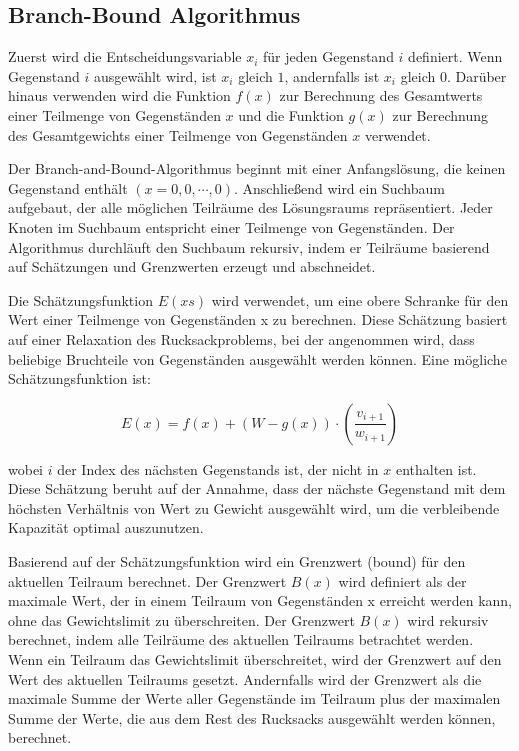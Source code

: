 \subsection{Branch-Bound Algorithmus}
Zuerst wird die Entscheidungsvariable $x_i$ für jeden 
Gegenstand $i$ definiert. Wenn Gegenstand $i$ ausgewählt wird, ist $x_i$ 
gleich $1$, andernfalls ist $x_i$ gleich $0$. Darüber hinaus 
verwenden wird die Funktion $f(x)$ zur Berechnung des 
Gesamtwerts einer Teilmenge von Gegenständen $x$ und die 
Funktion $g(x)$ zur Berechnung des Gesamtgewichts einer 
Teilmenge von Gegenständen $x$ verwendet.

Der Branch-and-Bound-Algorithmus beginnt mit einer 
Anfangslösung, die keinen Gegenstand enthält 
$(x = {0, 0, \cdots, 0})$. Anschließend wird ein Suchbaum 
aufgebaut, der alle möglichen Teilräume des Lösungsraums 
repräsentiert. Jeder Knoten im Suchbaum entspricht einer 
Teilmenge von Gegenständen. Der Algorithmus durchläuft den 
Suchbaum rekursiv, indem er Teilräume basierend auf 
Schätzungen und Grenzwerten erzeugt und abschneidet.

Die Schätzungsfunktion $E(xs)$ wird verwendet, um eine obere 
Schranke für den Wert einer Teilmenge von Gegenständen x zu 
berechnen. Diese Schätzung basiert auf einer Relaxation des 
Rucksackproblems, bei der angenommen wird, dass beliebige 
Bruchteile von Gegenständen ausgewählt werden können. Eine 
mögliche Schätzungsfunktion ist:

\begin{equation}
    E(x) = f(x) + (W - g(x)) \cdot \left(\frac{v_{i+1}}{w_{i+1}}\right)
\end{equation}

wobei $i$ der Index des nächsten Gegenstands ist, der nicht 
in $x$ enthalten ist. Diese Schätzung beruht auf der Annahme, 
dass der nächste Gegenstand mit dem höchsten Verhältnis von 
Wert zu Gewicht ausgewählt wird, um die verbleibende 
Kapazität optimal auszunutzen.

Basierend auf der Schätzungsfunktion wird ein Grenzwert 
(bound) für den aktuellen Teilraum berechnet. Der Grenzwert 
$B(x)$ wird definiert als der maximale Wert, der in einem 
Teilraum von Gegenständen x erreicht werden kann, ohne das 
Gewichtslimit zu überschreiten. Der Grenzwert $B(x)$ wird 
rekursiv berechnet, indem alle Teilräume des aktuellen 
Teilraums betrachtet werden. Wenn ein Teilraum das 
Gewichtslimit überschreitet, wird der Grenzwert auf den Wert 
des aktuellen Teilraums gesetzt. Andernfalls wird der 
Grenzwert als die maximale Summe der Werte aller Gegenstände 
im Teilraum plus der maximalen Summe der Werte, die aus dem 
Rest des Rucksacks ausgewählt werden können, berechnet.

